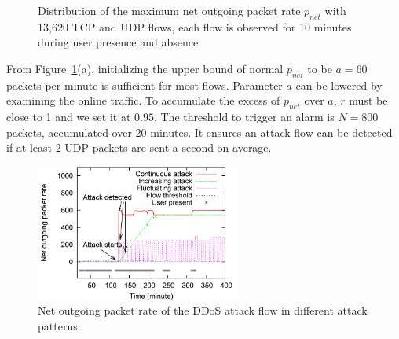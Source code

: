 \begin{figure}[htb]
\centering {}
\caption{Distribution of the maximum net outgoing
packet rate $p_{net}$ with 13,620 TCP and UDP flows, each flow is
observed for 10 minutes during user presence and absence}
\label{fig:ddos}
\end{figure}

From Figure~\ref{fig:ddos}(a), initializing the upper bound of normal
$p_{net}$ to be $a=60$ packets per minute is sufficient for most
flows. Parameter $a$ can be lowered by examining the online traffic. To
accumulate the excess of $p_{net}$ over $a$, $r$ must be close to 1
and we set it at $0.95$. The threshold to trigger an alarm is
$N=800$ packets, accumulated over 20 minutes. It ensures an attack
flow can be detected if at least 2 UDP packets are sent a second on
average.

\begin{figure}[htb]
\centering
\includegraphics[width=0.6\textwidth]{sensor/ddos-atkflow.png}
\caption{Net outgoing packet rate of the DDoS attack flow in
different attack patterns}
\label{fig:ddos-atkflow}
\end{figure}

